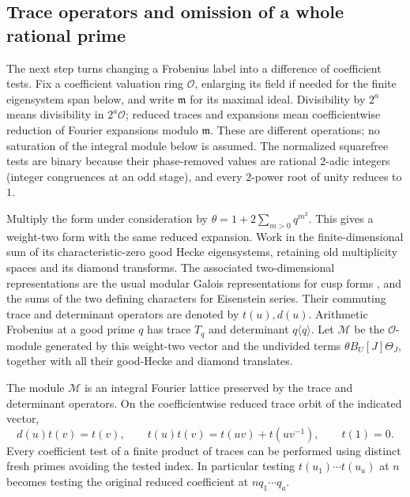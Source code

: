 \subsection{Trace operators and omission of a whole rational prime}

The next step turns changing a Frobenius label into a difference of
coefficient tests.  Fix a coefficient valuation ring $\mathcal O$,
enlarging its field if needed for the finite eigensystem span below,
and write $\mathfrak m$ for its maximal ideal.  Divisibility by $2^a$
means divisibility in $2^a\mathcal O$; reduced traces and expansions
mean coefficientwise reduction of Fourier expansions modulo $\mathfrak m$.
These are different operations; no saturation of the integral module
below is assumed.
The normalized squarefree tests are binary because their phase-removed
values are rational $2$-adic integers (integer congruences at an odd
stage), and every $2$-power root of unity reduces to $1$.

Multiply the form under consideration by
$\theta=1+2\sum_{m>0}q^{m^2}$.  This gives a weight-two form with the
same reduced expansion.  Work in the finite-dimensional sum of its
characteristic-zero good Hecke eigensystems, retaining old
multiplicity spaces and its diamond transforms.  The associated
two-dimensional representations are the usual modular Galois
representations for cusp forms \cite{Deligne1969}, and the sums of
the two defining characters for Eisenstein series.  Their commuting
trace and determinant operators are denoted by $t(u),d(u)$.
Arithmetic Frobenius at a good prime $q$ has trace $T_q$ and
determinant $q\langle q\rangle$.
Let $\mathcal M$ be the $\mathcal O$-module generated by this
weight-two vector and the undivided terms $\theta B_U[J]\Theta_J$,
together with all their good-Hecke and diamond translates.

\begin{lemma}\label{co:traces}
The module $\mathcal M$ is an integral Fourier lattice preserved by
the trace and determinant operators.  On the coefficientwise reduced
trace orbit of the indicated vector,
\begin{equation}\label{co:trace-identities}
 d(u)t(v)=t(v),\qquad
 t(u)t(v)=t(uv)+t(uv^{-1}),\qquad t(1)=0.
\end{equation}
Every coefficient test of a finite product of traces can be performed
using distinct fresh primes avoiding the tested index.  In particular
testing $t(u_1)\cdots t(u_a)$ at $n$ becomes testing the original
reduced coefficient at $nq_1\cdots q_a$.
\end{lemma}

